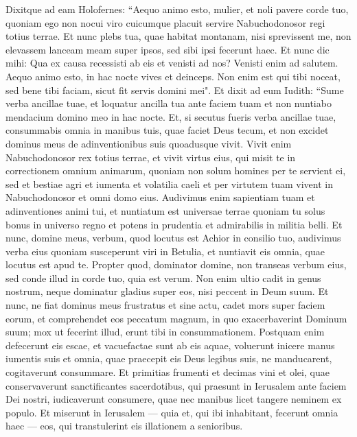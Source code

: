 \begin{biblechapter}  
\verse Dixitque ad eam Holofernes: “Aequo animo esto, mulier, et noli pavere corde tuo, quoniam ego non nocui viro cuicumque placuit servire Nabuchodonosor regi totius terrae. 
\verse Et nunc plebs tua, quae habitat montanam, nisi sprevissent me, non elevassem lanceam meam super ipsos, sed sibi ipsi fecerunt haec. 
\verse Et nunc dic mihi: Qua ex causa recessisti ab eis et venisti ad nos? Venisti enim ad salutem. Aequo animo esto, in hac nocte vives et deinceps. 
\verse Non enim est qui tibi noceat, sed bene tibi faciam, sicut fit servis domini mei". 
\verse Et dixit ad eum Iudith: “Sume verba ancillae tuae, et loquatur ancilla tua ante faciem tuam et non nuntiabo mendacium domino meo in hac nocte. 
\verse Et, si secutus fueris verba ancillae tuae, consummabis omnia in manibus tuis, quae faciet Deus tecum, et non excidet dominus meus de adinventionibus suis quoadusque vivit. 
\verse Vivit enim Nabuchodonosor rex totius terrae, et vivit virtus eius, qui misit te in correctionem omnium animarum, quoniam non solum homines per te servient ei, sed et bestiae agri et iumenta et volatilia caeli et per virtutem tuam vivent in Nabuchodonosor et omni domo eius. 
\verse Audivimus enim sapientiam tuam et adinventiones animi tui, et nuntiatum est universae terrae quoniam tu solus bonus in universo regno et potens in prudentia et admirabilis in militia belli. 
\verse Et nunc, domine meus, verbum, quod locutus est Achior in consilio tuo, audivimus verba eius quoniam susceperunt viri in Betulia, et nuntiavit eis omnia, quae locutus est apud te. 
\verse Propter quod, dominator domine, non transeas verbum eius, sed conde illud in corde tuo, quia est verum. Non enim ultio cadit in genus nostrum, neque dominatur gladius super eos, nisi peccent in Deum suum. 
\verse Et nunc, ne fiat dominus meus frustratus et sine actu, cadet mors super faciem eorum, et comprehendet eos peccatum magnum, in quo exacerbaverint Dominum suum; mox ut fecerint illud, erunt tibi in consummationem. 
\verse Postquam enim defecerunt eis escae, et vacuefactae sunt ab eis aquae, voluerunt inicere manus iumentis suis et omnia, quae praecepit eis Deus legibus suis, ne manducarent, cogitaverunt consummare. 
\verse Et primitias frumenti et decimas vini et olei, quae conservaverunt sanctificantes sacerdotibus, qui praesunt in Ierusalem ante faciem Dei nostri, iudicaverunt consumere, quae nec manibus licet tangere neminem ex populo. 
\verse Et miserunt in Ierusalem — quia et, qui ibi inhabitant, fecerunt omnia haec — eos, qui transtulerint eis illationem a senioribus. 

\end{biblechapter}
